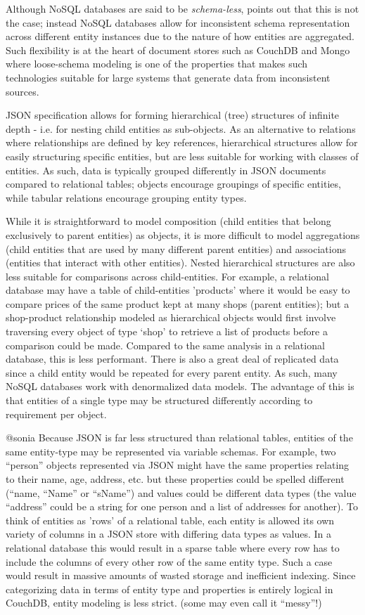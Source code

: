 Although NoSQL databases are said to be \textit{schema-less}, \cite{ATZENI2016} points out that this is not the case; instead NoSQL databases allow for inconsistent schema representation across different entity instances due to the nature of how entities are aggregated. Such flexibility is at the heart of document stores such as CouchDB and Mongo where loose-schema modeling is one of the properties that makes such technologies suitable for large systems that generate data from inconsistent sources.

JSON specification allows for forming hierarchical (tree) structures of infinite depth - i.e. for nesting child entities as sub-objects. As an alternative to relations where relationships are defined by key references, hierarchical structures allow for easily structuring specific entities, but are less suitable for working with classes of entities. As such, data is typically grouped differently in JSON documents compared to relational tables; objects encourage groupings of specific entities, while tabular relations encourage grouping entity types.

While it is straightforward to model composition (child entities that belong exclusively to parent entities) as objects, it is more difficult to model aggregations (child entities that are used by many different parent entities) and associations (entities that interact with other entities). Nested hierarchical structures are also less suitable for comparisons across child-entities. For example, a relational database may have a table of child-entities 'products' where it would be easy to compare prices of the same product kept at many shops (parent entities); but a shop-product relationship modeled as hierarchical objects would first involve traversing every object of type `shop' to retrieve a list of products before a comparison could be made. Compared to the same analysis in a relational database, this is less performant. There is also a great deal of replicated data since a child entity would be repeated for every parent entity. As such, many NoSQL databases work with denormalized data models. The advantage of this is that entities of a single type may be structured differently according to requirement per object.

@sonia
Because JSON is far less structured than relational tables, entities of the same entity-type may be represented via variable schemas. For example, two ``person'' objects represented via JSON might have the same properties relating to their name, age, address, etc. but these properties could be spelled different (``name, ``Name'' or ``sName'') and values could be different data types (the value ``address'' could be a string for one person and a list of addresses for another). To think of entities as 'rows' of a relational table, each entity is allowed its own variety of columns in a JSON store with differing data types as values. In a relational database this would result in a sparse table where every row has to include the columns of every other row of the same entity type. Such a case would result in massive amounts of wasted storage and inefficient indexing. Since categorizing data in terms of entity type and properties is entirely logical in CouchDB, entity modeling is less strict. (some may even call it ``messy''!)

